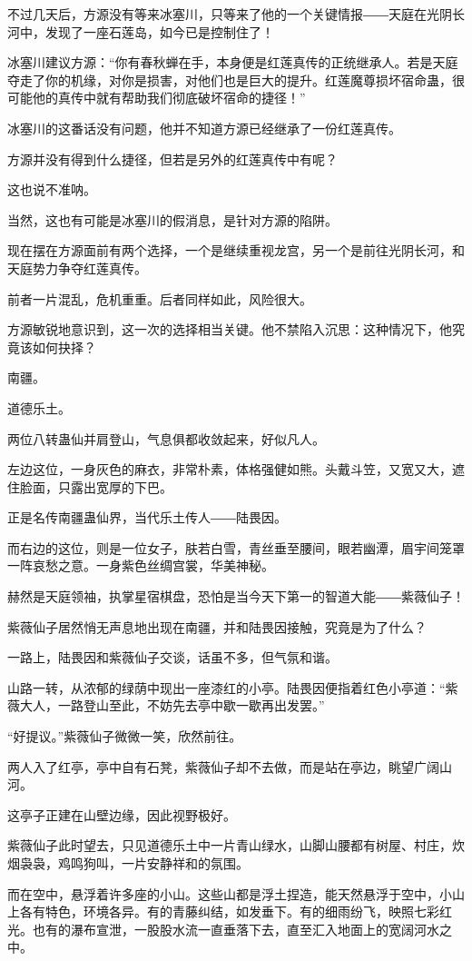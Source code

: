 \begin{this_body}
不过几天后，方源没有等来冰塞川，只等来了他的一个关键情报――天庭在光阴长河中，发现了一座石莲岛，如今已是控制住了！

冰塞川建议方源：“你有春秋蝉在手，本身便是红莲真传的正统继承人。若是天庭夺走了你的机缘，对你是损害，对他们也是巨大的提升。红莲魔尊损坏宿命蛊，很可能他的真传中就有帮助我们彻底破坏宿命的捷径！”

冰塞川的这番话没有问题，他并不知道方源已经继承了一份红莲真传。

方源并没有得到什么捷径，但若是另外的红莲真传中有呢？

这也说不准呐。

当然，这也有可能是冰塞川的假消息，是针对方源的陷阱。

现在摆在方源面前有两个选择，一个是继续重视龙宫，另一个是前往光阴长河，和天庭势力争夺红莲真传。

前者一片混乱，危机重重。后者同样如此，风险很大。

方源敏锐地意识到，这一次的选择相当关键。他不禁陷入沉思：这种情况下，他究竟该如何抉择？

南疆。

道德乐土。

两位八转蛊仙并肩登山，气息俱都收敛起来，好似凡人。

左边这位，一身灰色的麻衣，非常朴素，体格强健如熊。头戴斗笠，又宽又大，遮住脸面，只露出宽厚的下巴。

正是名传南疆蛊仙界，当代乐土传人――陆畏因。

而右边的这位，则是一位女子，肤若白雪，青丝垂至腰间，眼若幽潭，眉宇间笼罩一阵哀愁之意。一身紫色丝绸宫裳，华美神秘。

赫然是天庭领袖，执掌星宿棋盘，恐怕是当今天下第一的智道大能――紫薇仙子！

紫薇仙子居然悄无声息地出现在南疆，并和陆畏因接触，究竟是为了什么？

一路上，陆畏因和紫薇仙子交谈，话虽不多，但气氛和谐。

山路一转，从浓郁的绿荫中现出一座漆红的小亭。陆畏因便指着红色小亭道：“紫薇大人，一路登山至此，不妨先去亭中歇一歇再出发罢。”

“好提议。”紫薇仙子微微一笑，欣然前往。

两人入了红亭，亭中自有石凳，紫薇仙子却不去做，而是站在亭边，眺望广阔山河。

这亭子正建在山壁边缘，因此视野极好。

紫薇仙子此时望去，只见道德乐土中一片青山绿水，山脚山腰都有树屋、村庄，炊烟袅袅，鸡鸣狗叫，一片安静祥和的氛围。

而在空中，悬浮着许多座的小山。这些山都是浮土捏造，能天然悬浮于空中，小山上各有特色，环境各异。有的青藤纠结，如发垂下。有的细雨纷飞，映照七彩红光。也有的瀑布宣泄，一股股水流一直垂落下去，直至汇入地面上的宽阔河水之中。


\end{this_body}
